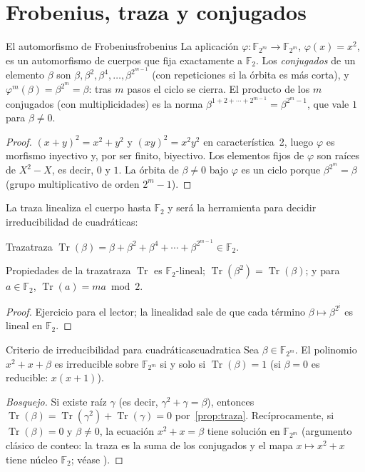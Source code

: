 \documentclass[11pt,a4paper,oneside]{report}
\newcommand{\F}{\mathbb{F}}
\newcommand{\GF}[1]{\mathbb{F}_{#1}}
\DeclareMathOperator{\Tr}{Tr}
\begin{document}
\section{Frobenius, traza y conjugados}\label{sec:frobenius}

\begin{proposicion}{El automorfismo de Frobenius}{frobenius}
La aplicación $\varphi\colon \GF{2^m}\to\GF{2^m}$, $\varphi(x)=x^2$, es un
automorfismo de cuerpos que fija exactamente a $\F_2$. Los
\emph{conjugados} de un elemento $\beta$ son
$\beta,\beta^2,\beta^4,\dots,\beta^{2^{m-1}}$ (con repeticiones si la
órbita es más corta), y $\varphi^m(\beta)=\beta^{2^m}=\beta$: tras $m$
pasos el ciclo se cierra. El producto de los $m$ conjugados (con
multiplicidades) es la norma $\beta^{1+2+\cdots+2^{m-1}}=\beta^{2^m-1}$,
que vale $1$ para $\beta\neq0$.
\end{proposicion}
\begin{proof}
$(x+y)^2=x^2+y^2$ y $(xy)^2=x^2y^2$ en característica~2, luego $\varphi$ es
morfismo inyectivo y, por ser finito, biyectivo. Los elementos fijos de
$\varphi$ son raíces de $X^2-X$, es decir, $0$ y $1$. La órbita de
$\beta\neq0$ bajo $\varphi$ es un ciclo porque $\beta^{2^m}=\beta$
(grupo multiplicativo de orden $2^m-1$).
\end{proof}

La traza linealiza el cuerpo hasta $\F_2$ y será la herramienta para
decidir irreducibilidad de cuadráticas:

\begin{definicion}{Traza}{traza}
$\Tr(\beta)=\beta+\beta^2+\beta^4+\cdots+\beta^{2^{m-1}}\in\F_2$.
\end{definicion}

\begin{proposicion}{Propiedades de la traza}{traza}
$\Tr$ es $\F_2$-lineal; $\Tr(\beta^2)=\Tr(\beta)$; y para $a\in\F_2$,
$\Tr(a)=ma \bmod 2$.
\end{proposicion}
\begin{proof}
Ejercicio para el lector; la linealidad sale de que cada término
$\beta\mapsto\beta^{2^i}$ es lineal en $\F_2$.
\end{proof}

\begin{teorema}{Criterio de irreducibilidad para cuadráticas}{cuadratica}
Sea $\beta\in\GF{2^m}$. El polinomio $x^2+x+\beta$ es irreducible sobre
$\GF{2^m}$ si y solo si $\Tr(\beta)=1$ \textnormal{(}si $\beta=0$ es
reducible: $x(x+1)$\textnormal{)}.
\end{teorema}
\begin{proof}[Bosquejo]
Si existe raíz $\gamma$ (es decir, $\gamma^2+\gamma=\beta$), entonces
$\Tr(\beta)=\Tr(\gamma^2)+\Tr(\gamma)=0$ por~\ref{prop:traza}. Recíprocamente,
si $\Tr(\beta)=0$ y $\beta\neq0$, la ecuación $x^2+x=\beta$ tiene solución
en $\GF{2^m}$ (argumento clásico de conteo: la traza es la suma de los
conjugados y el mapa $x\mapsto x^2+x$ tiene núcleo $\F_2$; véase
\cite{lidl}).
\end{proof}
\end{document}

